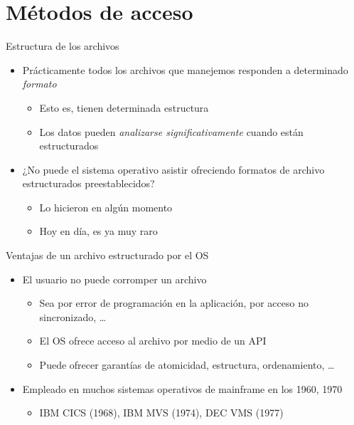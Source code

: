 \documentclass[presentation]{beamer}
\begin{document}
\section{Métodos de acceso}
\label{sec:orge273081}

\begin{frame}[label={sec:orgea76330}]{Estructura de los archivos}
\begin{itemize}
\item Prácticamente todos los archivos que manejemos responden a
determinado \emph{formato}
\begin{itemize}
\item Esto es, tienen determinada estructura
\item Los datos pueden \emph{analizarse significativamente} cuando están
estructurados
\end{itemize}
\item ¿No puede el sistema operativo asistir ofreciendo formatos de
archivo estructurados preestablecidos?
\begin{itemize}
\item Lo hicieron en algún momento
\item Hoy en día, es ya muy raro
\end{itemize}
\end{itemize}
\end{frame}

\begin{frame}[label={sec:orgc361b65}]{Ventajas de un archivo estructurado por el OS}
\begin{itemize}
\item El usuario no puede corromper un archivo
\begin{itemize}
\item Sea por error de programación en la aplicación, por acceso no
sincronizado, \ldots{}
\item El OS ofrece acceso al archivo por medio de un API
\item Puede ofrecer garantías de atomicidad, estructura, ordenamiento,
\ldots{}
\end{itemize}
\item Empleado en muchos sistemas operativos de mainframe en los 1960, 1970
\begin{itemize}
\item IBM CICS (1968), IBM MVS (1974), DEC VMS (1977)
\end{itemize}
\end{itemize}
\end{frame}
\end{document}

